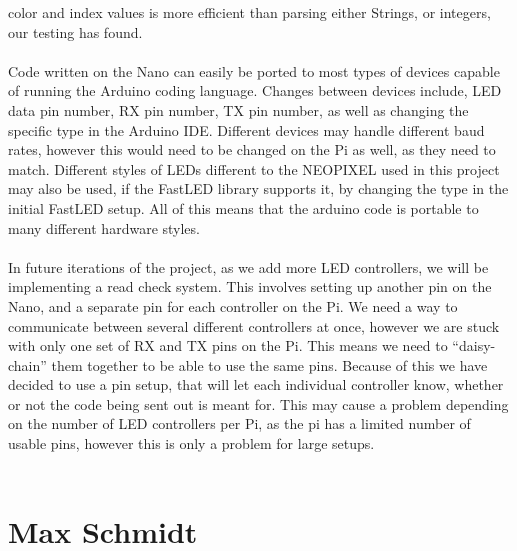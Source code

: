 \documentclass[onecolumn, draftclsnofoot,10pt, compsoc]{IEEEtran}
\begin{document}
	color and index values is more efficient than parsing either Strings, or
	integers, our testing has found.
	\\\\
	\noindent Code written on the Nano can easily be ported to most types of devices capable
	of running the Arduino coding language. Changes between devices include, LED
	data pin number, RX pin number, TX pin number, as well as changing the
	specific type in the Arduino IDE. Different devices may handle different baud
	rates, however this would need to be changed on the Pi as well, as they need to
	match. Different styles of LEDs different to the NEOPIXEL used in this project
	may also be used, if the FastLED library supports it, by changing the type in
	the initial FastLED setup. All of this means that the arduino code is portable
	to many different hardware styles.
	\\\\
	\noindent In future iterations of the project, as we add more LED controllers, we will
	be implementing a read check system. This involves setting up another pin on
	the Nano, and a separate pin for each controller on the Pi. We need a way to
	communicate between several different controllers at once, however we are
	stuck with only one set of RX and TX pins on the Pi. This means we need to
	“daisy-chain” them together to be able to use the same pins. Because of this
	we have decided to use a pin setup, that will let each individual controller
	know, whether or not the code being sent out is meant for. This may cause a
	problem depending on the number of LED controllers per Pi, as the pi has a
	limited number of usable pins, however this is only a problem for large setups.
	\\\\
	\section{Max Schmidt}
\end{document}
